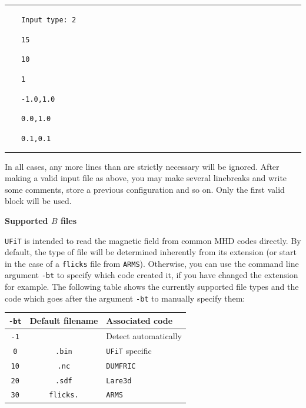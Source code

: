 \documentclass[12pt,twoside]{article}
\begin{document}
\vspace{2mm}

\noindent\rule{\linewidth}{0.4pt}

$\quad\quad$\texttt{Input type: 2}

$\quad\quad$\texttt{15}

$\quad\quad$\texttt{10}

$\quad\quad$\texttt{1}

$\quad\quad$\texttt{-1.0,1.0}

$\quad\quad$\texttt{0.0,1.0}

$\quad\quad$\texttt{0.1,0.1}

\noindent\rule{\linewidth}{0.4pt}

\vspace{2mm}

In all cases, any more lines than are strictly necessary will be ignored. After making a valid input file as above, you may make several linebreaks and write some comments, store a previous configuration and so on. Only the first valid block will be used.

\vspace{2mm}
{\Large \textbf{Supported $B$ files}}

\texttt{UFiT} is intended to read the magnetic field from common MHD codes directly. By default, the type of file will be determined inherently from its extension (or start in the case of a \texttt{flicks} file from \texttt{ARMS}). Otherwise, you can use the command line argument \texttt{-bt} to specify which code created it, if you have changed the extension for example. The following table shows the currently supported file types and the code which goes after the argument \texttt{-bt} to manually specify them:

\vspace{2mm}
\begin{tabular}{|c|c|l|}		
		\hline
		\texttt{-bt} & \textbf{Default filename} & \textbf{Associated code} \\\hline\hline
		\texttt{-1} &  & Detect automatically \\\hline
		\texttt{0}  &  \texttt{.bin} & \texttt{UFiT} specific \\\hline
		\texttt{10} & \texttt{.nc} & \texttt{DUMFRIC} \\\hline
		\texttt{20} & \texttt{.sdf} & \texttt{Lare3d} \\\hline
		\texttt{30} & \texttt{flicks.} & \texttt{ARMS} \\\hline
\end{tabular}
\vspace{2mm}
\end{document}
